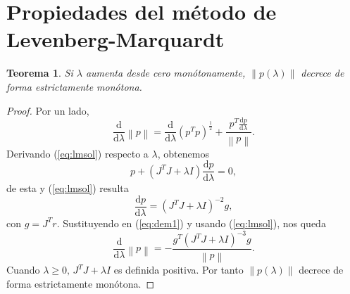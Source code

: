 \documentclass[11pt,a4paper]{book}
\newtheorem{theorem}{Teorema}[chapter]
\theoremstyle{definition}
\theoremstyle{remark}
\newcommand{\norm}[1]{\left\lVert#1\right\rVert}
\begin{document}
\section{Propiedades del método de Levenberg-Marquardt}
\begin{theorem}
	Si $\lambda$ aumenta desde cero monótonamente, $\norm{p(\lambda)}$ decrece de forma estrictamente monótona.
\end{theorem}
\begin{proof}
	Por un lado,
	\begin{equation}
		\label{eq:dem1}
		\frac{\mathrm{d}}{\mathrm{d}\lambda}\norm{p}=
		\frac{\mathrm{d}}{\mathrm{d}\lambda}(p^Tp)^{\frac{1}{2}}+
		\frac{p^T\frac{\mathrm{d}p}{\mathrm{d}\lambda}}{\norm{p}}.
	\end{equation}
	Derivando (\ref{eq:lmsol}) respecto a $\lambda$, obtenemos
	\begin{equation}
		\label{eq:dem2}
		p + (J^TJ+\lambda I)\frac{\mathrm{d}p}{\mathrm{d}\lambda} = 0,
	\end{equation}
	de esta y (\ref{eq:lmsol}) resulta
	\begin{equation}
		\label{eq:dem3}
		\frac{\mathrm{d}p}{\mathrm{d}\lambda}=(J^TJ+\lambda I)^{-2}g,
	\end{equation}
	con $g=J^Tr$. Sustituyendo en (\ref{eq:dem1}) y usando (\ref{eq:lmsol}), nos queda
	\begin{equation}
		\frac{\mathrm{d}}{\mathrm{d}\lambda}\norm{p}=
		-\frac{g^T(J^TJ+\lambda I)^{-3}g}{\norm{p}}.
	\end{equation}
	Cuando $\lambda \geq 0,\, J^TJ+\lambda I$ es definida positiva. Por tanto $\norm{p(\lambda)}$ 
	decrece de forma estrictamente monótona.
\end{proof}
\end{document}
